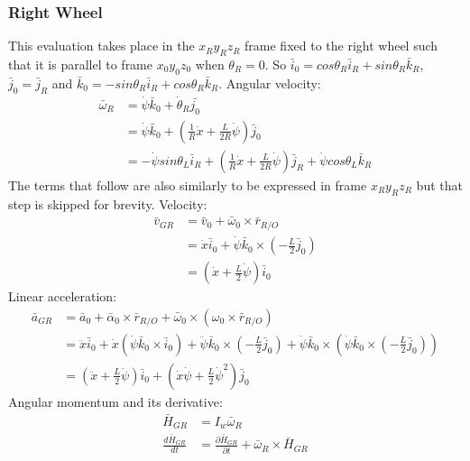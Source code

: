 \documentclass[a4paper,10pt]{article}
\begin{document}
\subsubsection{Right Wheel}
This evaluation takes place in the $x_Ry_Rz_R$ frame fixed to the right wheel such that it is parallel to 
frame $x_0y_0z_0$ when $\theta_R = 0$. So $\bar{i}_0 = cos\theta_R\bar{i}_R+sin\theta_R\bar{k}_R$, 
$\bar{j}_0 = \bar{j}_R$ and $\bar{k}_0 = -sin\theta_R\bar{i}_R+cos\theta_R\bar{k}_R$.
Angular velocity:
\begin{align}
 \bar{\omega}_R &= \dot\psi\bar{k}_0 + \dot\theta_R\bar{j_0} \nonumber \\
 &= \dot\psi\bar{k}_0 + \left(\frac{1}{R}\dot{x}+\frac{L}{2R}\dot\psi\right)\bar{j}_0 \nonumber \\
 &= -\dot\psi sin\theta_L\bar{i}_R + \left(\frac{1}{R}\dot{x}+\frac{L}{2R}\dot\psi\right)\bar{j}_R + \dot\psi cos\theta_L\bar{k}_R 
\end{align}
The terms that follow are also similarly to be expressed in frame $x_Ry_Rz_R$ but that step is skipped for brevity.
Velocity:
\begin{align}
  \bar{v}_{GR} &= \bar{v}_0 + \bar{\omega}_0 \times \bar{r}_{R/O} \nonumber \\
 &= \dot{x}\bar{i}_0 + \dot\psi\bar{k}_0 \times \left(-\frac{L}{2}\bar{j}_0\right) \nonumber \\
 &= \left(\dot{x}+\frac{L}{2}\dot\psi\right)\bar{i}_0  
\end{align}
Linear acceleration:
\begin{align}
 \bar{a}_{GR} &= \bar{a}_0 + \bar\alpha_0 \times \bar{r}_{R/O} + \bar\omega_0 \times \left( \omega_0 \times \bar{r}_{R/O}\right) \nonumber \\
 &= \ddot{x}\bar{i}_0 + \dot{x}\left(\dot\psi\bar{k}_0 \times \bar{i}_0\right)+ \ddot\psi\bar{k}_0 \times \left(-\frac{L}{2}\bar{j}_0\right) + \dot\psi\bar{k}_0 \times \left( \dot\psi\bar{k}_0 \times \left(-\frac{L}{2}\bar{j}_0\right)\right) \nonumber \\
 &= \left(\ddot{x}+\frac{L}{2}\ddot\psi\right)\bar{i}_0 + \left(\dot{x}\dot\psi + \frac{L}{2}\dot\psi^2\right)\bar{j}_0  
\end{align}
Angular momentum and its derivative:
\begin{align}
 \bar{H}_{GR} &= I_w\bar{\omega}_R \nonumber \\
 \frac{d\bar{H}_{GR}}{dt} &= \frac{\partial \bar{H}_{GR}}{\partial t} + \bar\omega_R \times \bar{H}_{GR} \nonumber \\
\end{align}
\end{document}
